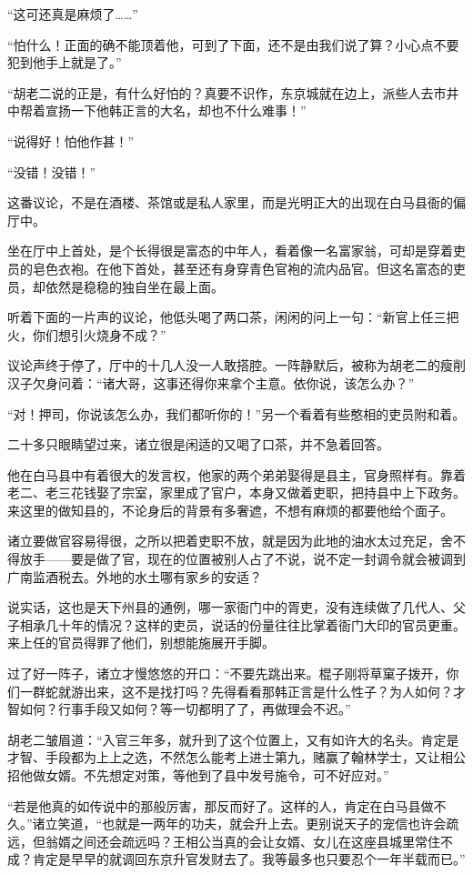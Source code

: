 “这可还真是麻烦了……”

“怕什么！正面的确不能顶着他，可到了下面，还不是由我们说了算？小心点不要犯到他手上就是了。”

“胡老二说的正是，有什么好怕的？真要不识作，东京城就在边上，派些人去市井中帮着宣扬一下他韩正言的大名，却也不什么难事！”

“说得好！怕他作甚！”

“没错！没错！”

这番议论，不是在酒楼、茶馆或是私人家里，而是光明正大的出现在白马县衙的偏厅中。

坐在厅中上首处，是个长得很是富态的中年人，看着像一名富家翁，可却是穿着吏员的皂色衣袍。在他下首处，甚至还有身穿青色官袍的流内品官。但这名富态的吏员，却依然是稳稳的独自坐在最上面。

听着下面的一片声的议论，他低头喝了两口茶，闲闲的问上一句：“新官上任三把火，你们想引火烧身不成？”

议论声终于停了，厅中的十几人没一人敢搭腔。一阵静默后，被称为胡老二的瘦削汉子欠身问着：“诸大哥，这事还得你来拿个主意。依你说，该怎么办？”

“对！押司，你说该怎么办，我们都听你的！”另一个看着有些憨相的吏员附和着。

二十多只眼睛望过来，诸立很是闲适的又喝了口茶，并不急着回答。

他在白马县中有着很大的发言权，他家的两个弟弟娶得是县主，官身照样有。靠着老二、老三花钱娶了宗室，家里成了官户，本身又做着吏职，把持县中上下政务。来这里的做知县的，不论身后的背景有多奢遮，不想有麻烦的都要他给个面子。

诸立要做官容易得很，之所以把着吏职不放，就是因为此地的油水太过充足，舍不得放手——要是做了官，现在的位置被别人占了不说，说不定一封调令就会被调到广南监酒税去。外地的水土哪有家乡的安适？

说实话，这也是天下州县的通例，哪一家衙门中的胥吏，没有连续做了几代人、父子相承几十年的情况？这样的吏员，说话的份量往往比掌着衙门大印的官员更重。来上任的官员得罪了他们，别想能施展开手脚。

过了好一阵子，诸立才慢悠悠的开口：“不要先跳出来。棍子刚将草窠子拨开，你们一群蛇就游出来，这不是找打吗？先得看看那韩正言是什么性子？为人如何？才智如何？行事手段又如何？等一切都明了了，再做理会不迟。”

胡老二皱眉道：“入官三年多，就升到了这个位置上，又有如许大的名头。肯定是才智、手段都为上上之选，不然怎么能考上进士第九，赌赢了翰林学士，又让相公招他做女婿。不先想定对策，等他到了县中发号施令，可不好应对。”

“若是他真的如传说中的那般厉害，那反而好了。这样的人，肯定在白马县做不久。”诸立笑道，“也就是一两年的功夫，就会升上去。更别说天子的宠信也许会疏远，但翁婿之间还会疏远吗？王相公当真的会让女婿、女儿在这座县城里常住不成？肯定是早早的就调回东京升官发财去了。我等最多也只要忍个一年半载而已。”

